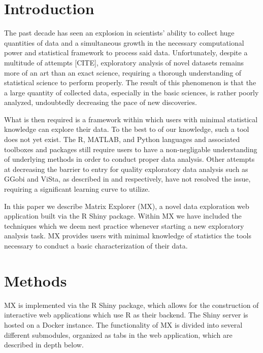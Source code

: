 \documentclass[12pt]{article}
\begin{document}
\newpage
{} %
\section{Introduction}
\label{sec:intro}

The past decade has seen an explosion in scientists' ability to collect huge quantities of data and a simultaneous growth in the necessary computational power and statistical framework to process said data. Unfortunately, despite a multitude of attempts [CITE], exploratory analysis of novel datasets remains more of an art than an exact science, requiring a thorough understanding of statistical science to perform properly. The result of this phenomenon is that the a large quantity of collected data, especially in the basic sciences, is rather poorly analyzed, undoubtedly decreasing the pace of new discoveries.

What is then required is a framework within which users with minimal statistical knowledge can explore their data. To the best to of our knowledge, such a tool does not yet exist. The R, MATLAB, and Python languages and associated toolboxes and packages still require users to have a non-negligable understanding of underlying methods in order to conduct proper data analysis. Other attempts at decreasing the barrier to entry for quality exploratory data analysis such as GGobi and ViSta, as described in \cite{swayne2003ggobi} and \cite{valero2011using} respectively, have not resolved the issue, requiring a significant learning curve to utilize.

In this paper we describe Matrix Explorer (MX), a novel data exploration web application built via the R Shiny package. Within MX we have included the techniques which we deem nest practice whenever starting a new exploratory analysis task. MX provides users with minimal knowledge of statistics the tools necessary to conduct a basic characterization of their data.

\section{Methods}
\label{sec:meth}

MX is implemented via the R Shiny package, which allows for the construction of interactive web applications which use R as their backend. The Shiny server is hosted on a Docker instance. The functionality of MX is divided into several different submodules, organized as tabs in the web application, which are described in depth below.
\end{document}
